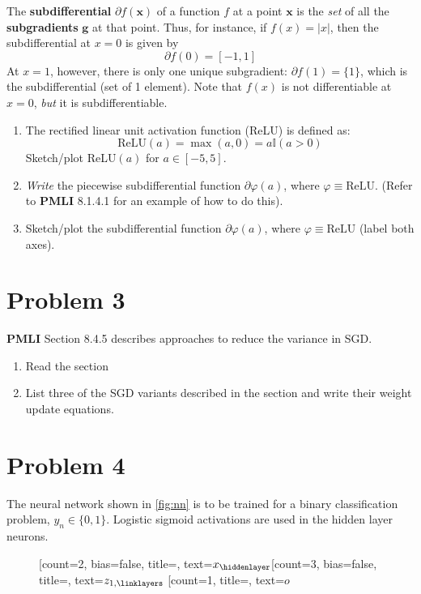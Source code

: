 \documentclass[11pt,twoside]{article}
\newcommand{\pts}[1]{\marginpar{ \small\hspace{0pt} \textit{[#1]} } }
\newcommand{\?}{\stackrel{?}{=}}
\begin{document}
The \textbf{subdifferential} $\partial f(\bm x)$ of a function $f$ at a point $\bm x$ is the \textit{set} of all the \textbf{subgradients} $\bm g$ at that point. Thus, for instance, if $f(x) = |x|$, then the subdifferential at $x = 0$ is given by
\begin{equation}
\partial f(0) = [-1,1]
\end{equation}
At $x=1$, however, there is only one unique subgradient: $\partial f(1) = \{1\}$, which is the subdifferential (set of 1 element).
Note that $f(x)$ is not differentiable at $x=0$, \textit{but} it is subdifferentiable.


\begin{enumerate}[\bf (a)]
\item The rectified linear unit activation function (ReLU) is defined as: \pts{2}
  \begin{equation}
    \text{ReLU}(a) = \max(a,0) = a\mathbb{I}(a>0)
  \end{equation}
  Sketch/plot ReLU$(a)$ for $a\in [-5,5]$.

\item \textit{Write} the piecewise subdifferential function $\partial \varphi(a)$, where $\varphi\equiv\text{ReLU}$.\pts{3}
  (Refer to \textbf{PMLI} 8.1.4.1
  for an example of how to do this).

\item Sketch/plot the subdifferential function $\partial \varphi(a)$, where $\varphi\equiv\text{ReLU}$ (label both axes).\pts{2}
\end{enumerate}


\section*{Problem 3 }
\textbf{PMLI} Section 8.4.5 describes approaches to reduce the variance in SGD.
\begin{enumerate}[\bf (a)]
\item Read the section
\item List three of the SGD variants described in the section and write their weight update equations.\pts{6}
\end{enumerate}

\section*{Problem 4 }
The neural network shown in \autoref{fig:nn} is to be trained for a binary classification problem, $y_{n} \in \{0,1\}$.
Logistic sigmoid activations are used in the hidden layer neurons.
  \begin{figure}[h!]
    \centering
    \begin{neuralnetwork}[height=4 ]
    \newcommand{\x}[2]{$x_#2$}
    \newcommand{\y}[2]{$o$}
    \newcommand{\hfirst}[2]{\small $z_{1,#2}$}
    [count=2, bias=false, title=, text=\x]
    \hiddenlayer[count=3, bias=false, title=, text=\hfirst] \linklayers
    \outputlayer[count=1, title=, text=\y] \linklayers
  \end{neuralnetwork}
  \caption{}
  \label{fig:nn}
\end{figure}
\end{document}
